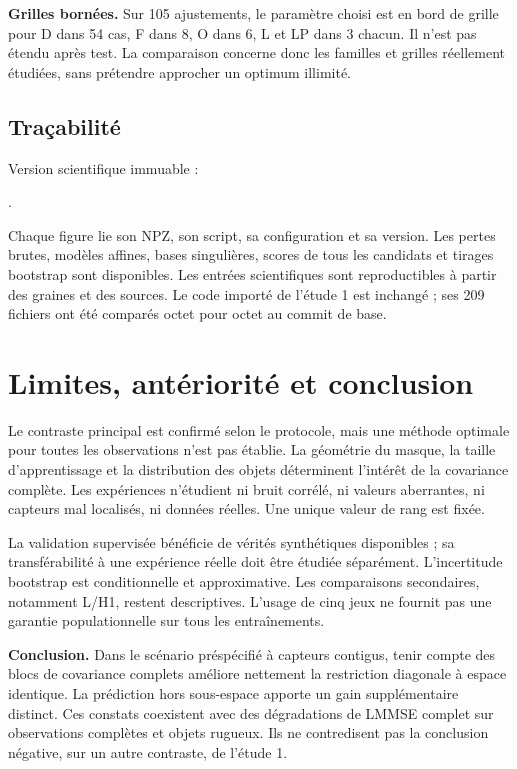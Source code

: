 \documentclass[11pt,a4paper]{article}
\begin{document}
\textbf{Grilles bornées.} Sur 105 ajustements, le paramètre choisi est en bord de grille pour D dans 54 cas, F dans 8, O dans 6, L et LP dans 3 chacun. Il n'est pas étendu après test. La comparaison concerne donc les familles et grilles réellement étudiées, sans prétendre approcher un optimum illimité.

\subsection{Traçabilité}
Version scientifique immuable :\par
{\small\texttt{\DataCommit}}.

Chaque figure lie son NPZ, son script, sa configuration et sa version. Les pertes brutes, modèles affines, bases singulières, scores de tous les candidats et tirages bootstrap sont disponibles. Les entrées scientifiques sont reproductibles à partir des graines et des sources. Le code importé de l'étude 1 est inchangé ; ses 209 fichiers ont été comparés octet pour octet au commit de base.

\newpage
\section{Limites, antériorité et conclusion}
Le contraste principal est confirmé selon le protocole, mais une méthode optimale pour toutes les observations n'est pas établie. La géométrie du masque, la taille d'apprentissage et la distribution des objets déterminent l'intérêt de la covariance complète. Les expériences n'étudient ni bruit corrélé, ni valeurs aberrantes, ni capteurs mal localisés, ni données réelles. Une unique valeur de rang est fixée.

La validation supervisée bénéficie de vérités synthétiques disponibles ; sa transférabilité à une expérience réelle doit être étudiée séparément. L'incertitude bootstrap est conditionnelle et approximative. Les comparaisons secondaires, notamment L/H1, restent descriptives. L'usage de cinq jeux ne fournit pas une garantie populationnelle sur tous les entraînements.

\textbf{Conclusion.} Dans le scénario préspécifié à capteurs contigus, tenir compte des blocs de covariance complets améliore nettement la restriction diagonale à espace identique. La prédiction hors sous-espace apporte un gain supplémentaire distinct. Ces constats coexistent avec des dégradations de LMMSE complet sur observations complètes et objets rugueux. Ils ne contredisent pas la conclusion négative, sur un autre contraste, de l'étude 1.
\end{document}

